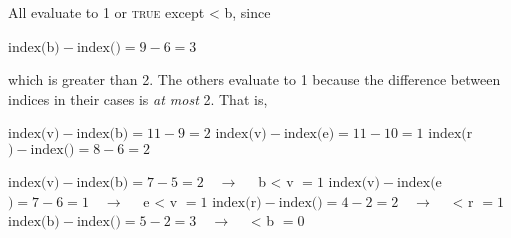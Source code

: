 All evaluate to 1 or \textsc{true} except \textsf{ < b}, since
\begin{exe}
	\ex $\text{index}($\textsf{b}$) - \text{index}($\textsf{\textrevglotstop}$) = 9 - 6 = 3$
\end{exe}
which is greater than 2.
The others evaluate to 1 because the difference between indices in their cases is \emph{at most} 2. That is,
\begin{exe}
    \ex \begin{xlist}
	\ex $\text{index}($\textsf{v}$) - \text{index}($\textsf{b}$) = 11 - 9 = 2$ 
	\ex $\text{index}($\textsf{v}$) - \text{index}($\textsf{e}$) = 11 - 10 = 1$ 
	\ex $\text{index}($\textsf{r}$) - \text{index}($\textsf{\textrevglotstop}$) = 8 - 6 = 2 $
    \end{xlist}
\end{exe}

\begin{exe}
    \ex \begin{xlist}
	\ex $\text{index}($\textsf{v}$) - \text{index}($\textsf{b}$) = 7 - 5 = 2 \quad\to\quad $ \textsf{b < v} $ =1 $
	\ex $\text{index}($\textsf{v}$) - \text{index}($\textsf{e}$) = 7 - 6 = 1 \quad\to\quad $ \textsf{e < v} $ =1 $
	\ex $\text{index}($\textsf{r}$) - \text{index}($\textsf{\textrevglotstop}$) = 4 - 2 = 2 \quad\to\quad $\textsf{ < r} $ =1 $
	\ex $\text{index}($\textsf{b}$) - \text{index}($\textsf{\textrevglotstop}$) = 5 - 2 = 3 \quad\to\quad $ \textsf{ < b} $ =0 $ 
    \end{xlist}
\end{exe}


